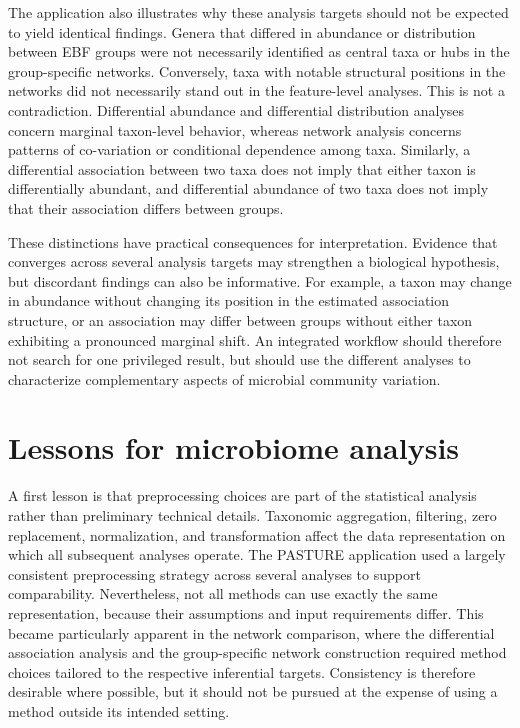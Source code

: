 The application also illustrates why these analysis targets should not be expected to yield identical findings. Genera that differed in abundance or distribution between EBF groups were not necessarily identified as central taxa or hubs in the group-specific networks. Conversely, taxa with notable structural positions in the networks did not necessarily stand out in the feature-level analyses. This is not a contradiction. Differential abundance and differential distribution analyses concern marginal taxon-level behavior, whereas network analysis concerns patterns of co-variation or conditional dependence among taxa. Similarly, a differential association between two taxa does not imply that either taxon is differentially abundant, and differential abundance of two taxa does not imply that their association differs between groups.

These distinctions have practical consequences for interpretation. Evidence that converges across several analysis targets may strengthen a biological hypothesis, but discordant findings can also be informative. For example, a taxon may change in abundance without changing its position in the estimated association structure, or an association may differ between groups without either taxon exhibiting a pronounced marginal shift. An integrated workflow should therefore not search for one privileged result, but should use the different analyses to characterize complementary aspects of microbial community variation.

\section{Lessons for microbiome analysis}

A first lesson is that preprocessing choices are part of the statistical analysis rather than preliminary technical details. Taxonomic aggregation, filtering, zero replacement, normalization, and transformation affect the data representation on which all subsequent analyses operate. The PASTURE application used a largely consistent preprocessing strategy across several analyses to support comparability. Nevertheless, not all methods can use exactly the same representation, because their assumptions and input requirements differ. This became particularly apparent in the network comparison, where the differential association analysis and the group-specific network construction required method choices tailored to the respective inferential targets. Consistency is therefore desirable where possible, but it should not be pursued at the expense of using a method outside its intended setting.

